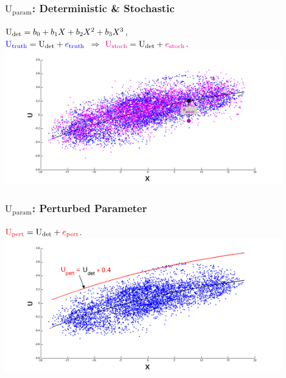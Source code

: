 \documentclass[graphics]{beamer}
\begin{document}
\begin{frame}
   \frametitle{$\text{U}_{\text{param}}$: Deterministic \& Stochastic}
      ${\color{black} \text{U}_{\text{det}} = b_0 + b_1X + b_2X^2 + b_3X^3}$, \\
      \vspace{8pt}
      ${\color{blue} \text{U}_{\text{truth}}} = {\color{black} \text{U}_{\text{det}}} + {\color{blue} e_{\text{truth}}}$ $\Longrightarrow$
      ${\color{magenta} \text{U}_{\text{stoch}}} = {\color{black} \text{U}_{\text{det}}} + {\color{magenta} e_{\text{stoch}}}$.
      \includegraphics[width=0.9\textwidth, height=0.55\textwidth]{stoch_cloud_finalcurve_stochparam}
\end{frame}

\begin{frame}%
   \frametitle{$\text{U}_{\text{param}}$: Perturbed Parameter} 
   \vspace{20pt}
   $  {\color{red} \text{U}_{\text{pert}} } = {\color{black} \text{U}_{\text{det}}} + {\color{red} e_{\text{pert}} } $. \\
   \includegraphics[width=0.9\textwidth, height=0.55\textwidth]{stoch_cloud_finalcurve_pert_single} 
\end{frame}
\end{document}
